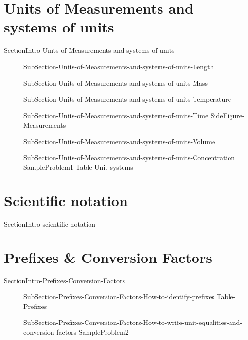 \documentclass[main.tex]{subfiles}
\newcommand\chapterlabel{Ch-measurements}\setcounter{figurenewcounter}{0}\setcounter{tablenewcounter}{0}\setcounter{formulanewcounter}{0}\chapterpicture{../{\chapterlabel}/figure1}\chapterpicturelabel{PngImg}
\begin{document}
\section{Units of Measurements and systems of units}
{SectionIntro-Units-of-Measurements-and-systems-of-units}
\sloppy\begin{description}
\item[]{SubSection-Units-of-Measurements-and-systems-of-units-Length}
\item[]{SubSection-Units-of-Measurements-and-systems-of-units-Mass}
\item[]{SubSection-Units-of-Measurements-and-systems-of-units-Temperature}
\item[]{SubSection-Units-of-Measurements-and-systems-of-units-Time}
{SideFigure-Measurements}
\item[]{SubSection-Units-of-Measurements-and-systems-of-units-Volume}
\item[]{SubSection-Units-of-Measurements-and-systems-of-units-Concentration}
{SampleProblem1}
\newpage
{Table-Unit-systems}
\end{description}

\section{Scientific notation} {SectionIntro-scientific-notation}
\section{Prefixes \& Conversion Factors}
{SectionIntro-Prefixes-Conversion-Factors}
\sloppy\begin{description}
\item[]{SubSection-Prefixes-Conversion-Factors-How-to-identify-prefixes}
{Table-Prefixes}
\item[]{SubSection-Prefixes-Conversion-Factors-How-to-write-unit-equalities-and-conversion-factors}
{SampleProblem2}
\end{description}
\end{document}
